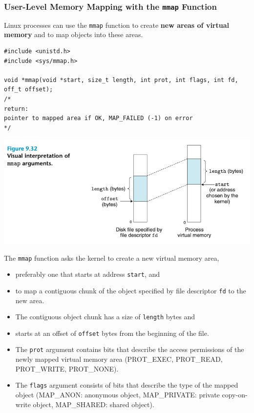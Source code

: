 \documentclass[11pt]{article}
\begin{document}
\subsubsection{User-Level Memory Mapping with the \texttt{mmap} Function}
\label{sec:org479b61f}
Linux processes can use the \texttt{mmap} function to create \textbf{new areas of virtual memory} and to map objects into these areas.\\

\begin{verbatim}
#include <unistd.h>
#include <sys/mmap.h>

void *mmap(void *start, size_t length, int prot, int flags, int fd, off_t offset);
/* 
return:
pointer to mapped area if OK, MAP_FAILED (-1) on error
*/
\end{verbatim}

\begin{center}
\includegraphics[width=.9\linewidth]{pics/figure9.32-mmap.png}
\end{center}

The \texttt{mmap} function asks the kernel to create a new virtual memory area,\\
\begin{itemize}
\item preferably one that starts at address \texttt{start}, and\\
\item to map a contiguous chunk of the object specified by file descriptor \texttt{fd} to the new area.\\
\item The contiguous object chunk has a size of \texttt{length} bytes and\\
\item starts at an offset of \texttt{offset} bytes from the beginning of the file.\\
\item The \texttt{prot} argument contains bits that describe the access permissions of the newly mapped virtual memory area (PROT\_EXEC, PROT\_READ, PROT\_WRITE, PROT\_NONE).\\
\item The \texttt{flags} argument consists of bits that describe the type of the mapped object (MAP\_ANON: anonymous object, MAP\_PRIVATE: private copy-on-write object, MAP\_SHARED: shared object).\\
\end{itemize}
\end{document}
